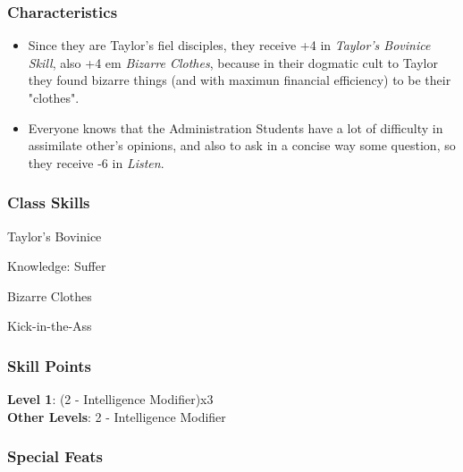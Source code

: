 \documentclass[ letterpaper,12pt]{article}
\begin{document}
\subsubsection{Characteristics}
\begin{itemize}
\item{Since they are Taylor's fiel disciples, they receive +4 in {\it Taylor's Bovinice Skill}, also +4 em {\it Bizarre Clothes}, because in their dogmatic cult to Taylor they found bizarre things (and with maximun financial efficiency) to be their "clothes".}
\item{Everyone knows that the Administration Students have a lot of difficulty in assimilate other's opinions, and also to ask in a concise way some question, so they receive -6 in {\it Listen}.}
\end{itemize}

\subsubsection{Class Skills}
\begin{itemize}
{\it
\item{Taylor's Bovinice}
\item{Knowledge: Suffer}
\item{Bizarre Clothes}
\item{Kick-in-the-Ass}
}
\end{itemize}

\subsubsection{Skill Points}
{\bf Level 1}: (2 - Intelligence Modifier)x3\\
{\bf Other Levels}: 2 - Intelligence Modifier\\

\subsubsection{Special Feats}
\end{document}
